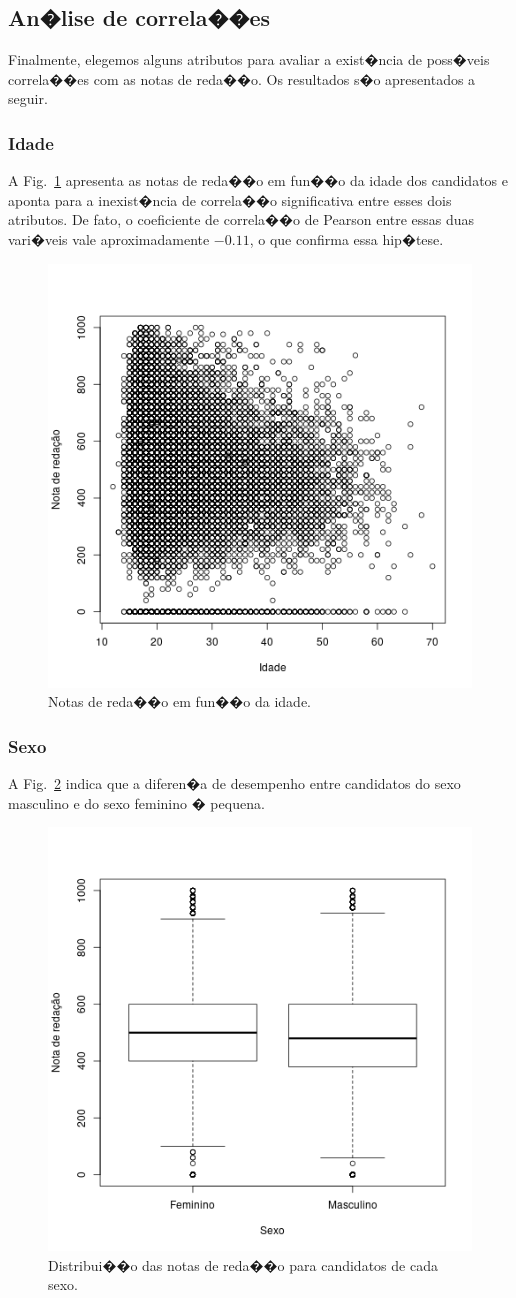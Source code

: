 \documentclass[12pt]{article}
\newcommand{\reffig}[1]{Fig.~\ref{fig:#1}}
\begin{document}
\subsection{An�lise de correla��es}
Finalmente, elegemos alguns atributos para avaliar a exist�ncia de poss�veis correla��es com as notas de reda��o.
Os resultados s�o apresentados a seguir.

\subsubsection{Idade}
A \reffig{correlacao-idade} apresenta as notas de reda��o em fun��o da idade dos candidatos e aponta para a inexist�ncia de correla��o significativa entre esses dois atributos.
De fato, o coeficiente de correla��o de Pearson entre essas duas vari�veis vale aproximadamente $-0.11$, o que confirma essa hip�tese.

\begin{figure}[H]
\centering\includegraphics[width=.5\linewidth]{../correlacao_idade.png}
\caption{Notas de reda��o em fun��o da idade.}
\label{fig:correlacao-idade}
\end{figure}

\subsubsection{Sexo}
A \reffig{correlacao-sexo} indica que a diferen�a de desempenho entre candidatos do sexo masculino e do sexo feminino � pequena.

\begin{figure}[H]
\centering\includegraphics[width=.5\linewidth]{../correlacao_sexo.png}
\caption{Distribui��o das notas de reda��o para candidatos de cada sexo.}
\label{fig:correlacao-sexo}
\end{figure}
\end{document}
